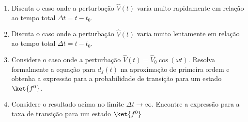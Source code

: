 \begin{enumerate}
\begin{enumerate}
		            formalmente a equação para $d_f(t)$ na aproximação de primeira ordem e
		            obtenha a expressão para a probabilidade de transição para um estado
		            $\ket{f^0}$.
		      \item Discuta o caso onde a perturbação $\hat{V}(t)$ varia muito
		            rapidamente em relação ao tempo total $\Delta t = t-t_0$.
		      \item Discuta o caso onde a perturbação $\hat{V}(t)$ varia muito
		            lentamente em relação ao tempo total $\Delta t = t-t_0$.
		      \item Considere o caso onde a perturbação $\hat{V}(t) = \hat{V}_0 \cos(\omega t)$.
		            Resolva formalmente a equação para $d_f(t)$ na aproximação de primeira
		            ordem e obtenha a expressão para a probabilidade de transição para um
		            estado $\ket{f^0}$.
		      \item Considere o resultado acima no limite $\Delta t \rightarrow \infty$.
		            Encontre a expressão para a taxa de transição para um estado $\ket{f^0}$
	      \end{enumerate}
\end{enumerate}


